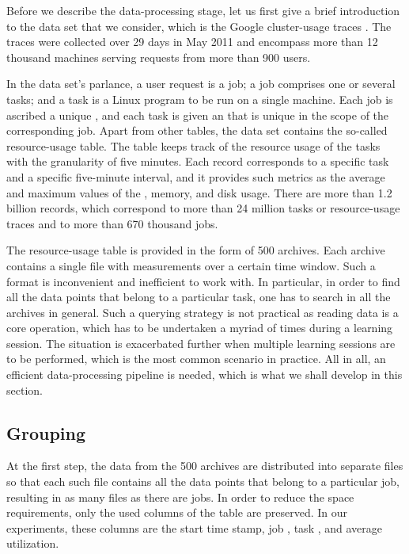 Before we describe the data-processing stage, let us first give a brief
introduction to the data set that we consider, which is the Google cluster-usage
traces \cite{reiss2011}. The traces were collected over 29 days in May 2011 and
encompass more than 12 thousand machines serving requests from more than 900
users.

In the data set's parlance, a user request is a job; a job comprises one or
several tasks; and a task is a Linux program to be run on a single machine.
Each job is ascribed a unique , and each task is given an  that is
unique in the scope of the corresponding job. Apart from other tables, the data
set contains the so-called resource-usage table. The table keeps track of the
resource usage of the tasks with the granularity of five minutes. Each record
corresponds to a specific task and a specific five-minute interval, and it
provides such metrics as the average and maximum values of the , memory,
and disk usage. There are more than 1.2 billion records, which correspond to
more than 24 million tasks or resource-usage traces and to more than 670
thousand jobs.

The resource-usage table is provided in the form of 500 archives. Each archive
contains a single  file with measurements over a certain time window.
Such a format is inconvenient and inefficient to work with. In particular, in
order to find all the data points that belong to a particular task, one has to
search in all the archives in general. Such a querying strategy is not practical
as reading data is a core operation, which has to be undertaken a myriad of
times during a learning session. The situation is exacerbated further when
multiple learning sessions are to be performed, which is the most common
scenario in practice. All in all, an efficient data-processing pipeline is
needed, which is what we shall develop in this section.

\subsection{Grouping} 
At the first step, the  data from the 500 archives are distributed into
separate  files so that each such file contains all the data points that
belong to a particular job, resulting in as many  files as there are
jobs. In order to reduce the space requirements, only the used columns of the
table are preserved. In our experiments, these columns are the start time stamp,
job , task , and average  utilization.

